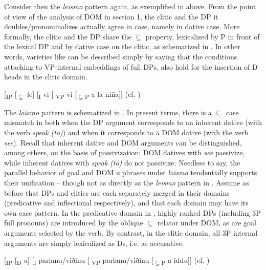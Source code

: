 \documentclass[output=paper]{langscibook}
\begin{document}
Consider then the \textit{leismo} pattern again, as exemplified in  above. From the point of view of the analysis of DOM in section 1, the clitic and the DP it doubles/pronominalizes actually agree in case, namely in dative case. More formally, the clitic and the DP share the ${\subseteq}$ property, lexicalized by P in front of the lexical DP and by dative case on the clitic, as schematized in . In other words, varieties like  can be described simply by saying that the conditions attaching to VP-internal embeddings of full DPs, also hold for the insertion of D heads in the clitic domain.  

\ea\label{ex:manzini:}
[\textsubscript{IP} [\textsubscript{${\subseteq}$} le]  [\textsubscript{I} vi   [\textsubscript{ VP} \sout{vi}  [\textsubscript{${\subseteq}$P} a la niña]]    \hfill (cf. )\\
\z

The \textit{loismo} pattern is schematized in . In present terms, there is a ${\subseteq}$ case mismatch in  both when the DP argument corresponds to an inherent dative (with the verb \textit{speak} \textit{(to)}) and when it corresponds to a DOM dative (with the verb \textit{see}). Recall that inherent dative and DOM arguments can be distinguished, among others, on the basis of passivization; DOM datives with \textit{see} passivize, while inherent datives with \textit{speak} \textit{(to)} do not passivize. Needless to say, the parallel behavior of goal and DOM \textit{a} phrases under \textit{loismo} tendentially supports their unification – though not as directly as the \textit{leismo} pattern in . Assume as before that DPs and clitics are each separately merged in their domains (predicative and inflectional respectively), and that each domain may have its own case pattern. In the predicative domain in , highly ranked DPs (including 3P full pronouns) are introduced by the oblique ${\subseteq}$ relator under DOM, as are goal arguments selected by the verb. By contrast, in the clitic domain, all 3P internal arguments are simply lexicalized as Ds, i.e. as accusative.

\ea\label{ex:manzini:}
[\textsubscript{IP} [\textsubscript{D} u] [\textsubscript{I} parlanu/viðinu   [\textsubscript{ VP} \sout{parlanu/viðinu}  [\textsubscript{${\subseteq}$P} a iddu]]                    \hfill (cf. ) \\
\z
\end{document}
